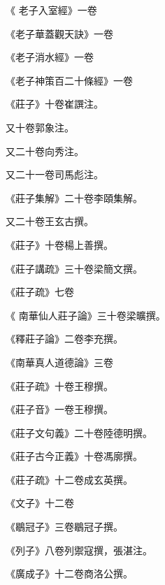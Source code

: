 \begin{pinyinscope}
 《
 老子入室經》一卷



 《老子華蓋觀天訣》一卷



 《老子消水經》一卷



 《老子神策百二十條經》一卷



 《莊子》十卷崔譔注。



 又十卷郭象注。



 又二十卷向秀注。



 又二十一卷司馬彪注。



 《莊子集解》二十卷李頤集解。



 又二十卷王玄古撰。



 《莊子》十卷楊上善撰。



 《莊子講疏》三十卷梁簡文撰。



 《莊子疏》七卷



 《
 南華仙人莊子論》三十卷梁曠撰。



 《釋莊子論》二卷李充撰。



 《南華真人道德論》三卷



 《莊子疏》十卷王穆撰。



 《莊子音》一卷王穆撰。



 《莊子文句義》二十卷陸德明撰。



 《莊子古今正義》十卷馮廓撰。



 《莊子疏》十二卷成玄英撰。



 《文子》十二卷



 《鶡冠子》三卷鶡冠子撰。



 《列子》八卷列禦寇撰，張湛注。



 《廣成子》十二卷商洛公撰。




\end{pinyinscope}
